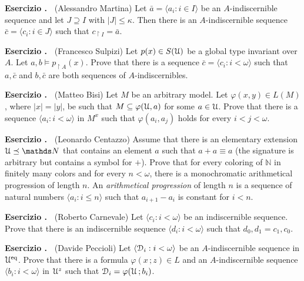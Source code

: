 \documentclass[10pt]{article}
\def\phi{\varphi}
\def\D{\EuScript D}
\def\U{\EuScript U}
\def\NN{\mathds N}
\def\<{\langle}
\def\>{\rangle}
\def\eq{{\rm eq}}
\newcounter{ex}
\newenvironment{exercise}{\bigskip\addtocounter{ex}{1}\textbf{Esercizio \theex.\ }}{}
\begin{document}
\begin{exercise}
  (Alessandro Martina)
  Let $\bar a=\<a_i:i\in I\>$ be an $A$-indiscernible sequence and let $J\supseteq I$ with $|J|\le \kappa$.
  Then there is an $A$-indiscernible sequence $\bar c=\<c_i:i\in J\>$ such that $c_{\restriction I}=\bar a$.
\end{exercise}

\begin{exercise} 
  (Francesco Sulpizi)
  Let  $p(x)\in S(\U)$ be a global type invariant over $A$.
  Let $a,b\models p_{\restriction A}(x)$.
  Prove that there is a sequence $\bar c=\<c_i:i<\omega\>$ such that $a,\bar c$ and $b,\bar c$ are both sequences of $A$-indiscernibles.
\end{exercise}

\begin{exercise}
  (Matteo Bisi)
  Let $M$ be an arbitrary model.
  Let $\phi(x,y)\in L(M)$, where $|x|=|y|$, be such that $M\subseteq\phi(\U,a)$ for some $a\in\U$.
  Prove that there is a sequence $\langle a_i:i<\omega\rangle$ in $M^{x}$ such that $\phi(a_i,a_j)$ holds for every $i<j<\omega$.
\end{exercise}

\begin{exercise}
  (Leonardo Centazzo)
  Assume that there is an elementary extension $\U\preceq\NN$ that contains an element $a$ such that $a+a\equiv a$ (the signature is arbitrary but contains a symbol for $+$).
  Prove that for every coloring of $\NN$ in finitely many colors and for every $n<\omega$, there is a monochromatic arithmetical progression of length $n$.
  An \textit{arithmetical progression\/} of length $n$ is a sequence of natural numbers $\langle a_i : i\le n\rangle$ such that $a_{i+1} - a_i$ is constant for $i<n$.
\end{exercise}

\begin{exercise}
  (Roberto Carnevale)
  Let $\<c_i:i<\omega\>$ be an indiscernible sequence.
  Prove that there is an indiscernible sequence $\<d_i:i<\omega\>$ such that $d_0,d_1 = c_1,c_0$.
\end{exercise}

\begin{exercise}
  (Davide Peccioli)
  Let $\<\D_i:i<\omega\>$ be an $A$-indiscernible sequence in $\U^\eq$.
  Prove that there is a formula $\phi(x\,;z)\in L$ and an $A$-indiscernible sequence $\<b_i:i<\omega\>$ in $\U^z$ such that $\D_i=\phi(\U\,;b_i)$.
\end{exercise}
\end{document}
